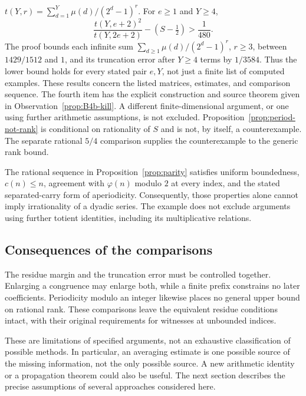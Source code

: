 \begin{prop}
$t(Y,r)=\sum_{d=1}^{Y}\mu(d)/(2^d-1)^r$. For $e\ge1$ and $Y\ge4$,
\[
 \frac{t(Y,e+2)^2}{t(Y,2e+2)}-(S-\tfrac12)>\frac1{480}.
\]
The proof bounds each infinite sum
$\sum_{d\ge1}\mu(d)/(2^d-1)^r$, $r\ge3$, between $1429/1512$ and $1$,
and its truncation error after $Y\ge4$ terms by $1/3584$.
Thus the lower bound holds for every stated pair $e,Y$, not just a finite
list of computed examples.
These results concern the listed matrices, estimates, and comparison
sequence. The fourth item has the explicit construction and source theorem given
in Observation~\ref{prop:B4b-kill}. A different finite-dimensional argument,
or one using further arithmetic assumptions, is not excluded.
Proposition~\ref{prop:period-not-rank} is conditional on rationality of
$S$ and is not, by itself, a counterexample. The separate rational $5/4$
comparison supplies the counterexample to the generic rank bound.
\end{prop}

\begin{prop}
\label{prop:b7}
The rational sequence in Proposition~\ref{prop:parity} satisfies uniform
boundedness, $c(n)\le n$, agreement with $\varphi(n)$ modulo $2$ at every
index, and the stated separated-carry form of aperiodicity. Consequently,
those properties alone cannot imply irrationality of a dyadic series.
The example does not exclude arguments using further totient identities,
including its multiplicative relations.
\end{prop}

\subsection{Consequences of the comparisons}

The residue margin and the truncation error must be controlled
together. Enlarging a congruence may enlarge both, while a finite
prefix constrains no later coefficients. Periodicity modulo an
integer likewise places no general upper bound on rational rank.
These comparisons leave the equivalent residue conditions intact,
with their original requirements for witnesses at unbounded indices.

These are limitations of specified arguments, not an exhaustive
classification of possible methods. In particular, an averaging estimate is
one possible source of the missing information, not the only possible
source. A new arithmetic identity or a propagation theorem could also be
useful. The next section describes the precise assumptions of several
approaches considered here.

